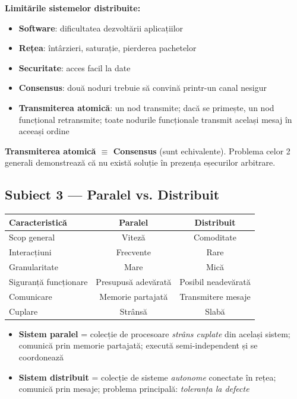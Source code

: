 \documentclass[a4paper,11pt]{article}
\newcommand{\thead}[1]{\cellcolor{tblh}\color{white}\textbf{#1}}
\newcommand{\subiect}[2]{\subsection{Subiect \textcolor{numcol}{#1} — #2}}
\begin{document}
\textbf{Limitările sistemelor distribuite:}
\begin{itemize}[noitemsep]
  \item \textbf{Software}: dificultatea dezvoltării aplicațiilor
  \item \textbf{Rețea}: întârzieri, saturație, pierderea pachetelor
  \item \textbf{Securitate}: acces facil la date
  \item \textbf{Consensus}: două noduri trebuie să convină printr-un canal nesigur
  \item \textbf{Transmiterea atomică}: un nod transmite; dacă se primește, un nod funcțional retransmite; toate nodurile funcționale transmit același mesaj în aceeași ordine
\end{itemize}

\begin{notebox}
\textbf{Transmiterea atomică $\equiv$ Consensus} (sunt echivalente). Problema celor 2 generali demonstrează că nu există soluție în prezența eșecurilor arbitrare.
\end{notebox}

\subiect{3}{Paralel vs. Distribuit}

\begin{center}
\begin{tabular}{lcc}
\toprule
\thead{Caracteristică} & \thead{Paralel} & \thead{Distribuit} \\
\midrule
Scop general & Viteză & Comoditate \\
Interacțiuni & Frecvente & Rare \\
Granularitate & Mare & Mică \\
Siguranță funcționare & Presupusă adevărată & Posibil neadevărată \\
Comunicare & Memorie partajată & Transmitere mesaje \\
Cuplare & Strânsă & Slabă \\
\bottomrule
\end{tabular}
\end{center}

\begin{itemize}[noitemsep]
  \item \textbf{Sistem paralel} = colecție de procesoare \emph{strâns cuplate} din același sistem; comunică prin memorie partajată; execută semi-independent și se coordonează
  \item \textbf{Sistem distribuit} = colecție de sisteme \emph{autonome} conectate în rețea; comunică prin mesaje; problema principală: \emph{toleranța la defecte}
\end{itemize}
\end{document}
